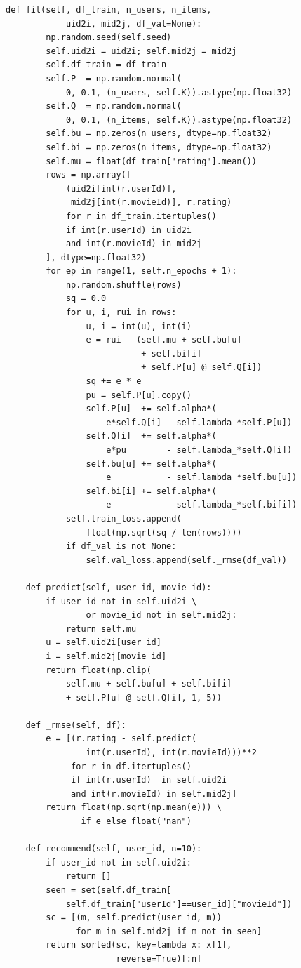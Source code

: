 ﻿\documentclass[../BTL.tex]{subfiles}
\begin{document}
\begin{lstlisting}[style=python,
    caption={models.py -- User-based CF / Item-based CF /
              Matrix Factorization / RecommendationSystem facade}]
    def fit(self, df_train, n_users, n_items,
            uid2i, mid2j, df_val=None):
        np.random.seed(self.seed)
        self.uid2i = uid2i; self.mid2j = mid2j
        self.df_train = df_train
        self.P  = np.random.normal(
            0, 0.1, (n_users, self.K)).astype(np.float32)
        self.Q  = np.random.normal(
            0, 0.1, (n_items, self.K)).astype(np.float32)
        self.bu = np.zeros(n_users, dtype=np.float32)
        self.bi = np.zeros(n_items, dtype=np.float32)
        self.mu = float(df_train["rating"].mean())
        rows = np.array([
            (uid2i[int(r.userId)],
             mid2j[int(r.movieId)], r.rating)
            for r in df_train.itertuples()
            if int(r.userId) in uid2i
            and int(r.movieId) in mid2j
        ], dtype=np.float32)
        for ep in range(1, self.n_epochs + 1):
            np.random.shuffle(rows)
            sq = 0.0
            for u, i, rui in rows:
                u, i = int(u), int(i)
                e = rui - (self.mu + self.bu[u]
                           + self.bi[i]
                           + self.P[u] @ self.Q[i])
                sq += e * e
                pu = self.P[u].copy()
                self.P[u]  += self.alpha*(
                    e*self.Q[i] - self.lambda_*self.P[u])
                self.Q[i]  += self.alpha*(
                    e*pu        - self.lambda_*self.Q[i])
                self.bu[u] += self.alpha*(
                    e           - self.lambda_*self.bu[u])
                self.bi[i] += self.alpha*(
                    e           - self.lambda_*self.bi[i])
            self.train_loss.append(
                float(np.sqrt(sq / len(rows))))
            if df_val is not None:
                self.val_loss.append(self._rmse(df_val))

    def predict(self, user_id, movie_id):
        if user_id not in self.uid2i \
                or movie_id not in self.mid2j:
            return self.mu
        u = self.uid2i[user_id]
        i = self.mid2j[movie_id]
        return float(np.clip(
            self.mu + self.bu[u] + self.bi[i]
            + self.P[u] @ self.Q[i], 1, 5))

    def _rmse(self, df):
        e = [(r.rating - self.predict(
                int(r.userId), int(r.movieId)))**2
             for r in df.itertuples()
             if int(r.userId)  in self.uid2i
             and int(r.movieId) in self.mid2j]
        return float(np.sqrt(np.mean(e))) \
               if e else float("nan")

    def recommend(self, user_id, n=10):
        if user_id not in self.uid2i:
            return []
        seen = set(self.df_train[
            self.df_train["userId"]==user_id]["movieId"])
        sc = [(m, self.predict(user_id, m))
              for m in self.mid2j if m not in seen]
        return sorted(sc, key=lambda x: x[1],
                      reverse=True)[:n]


\end{lstlisting}
\end{document}

